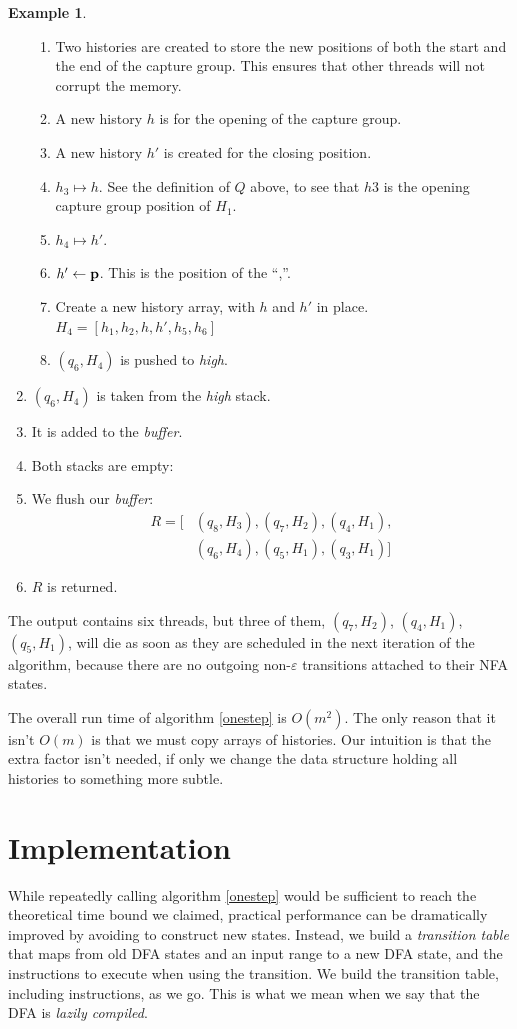 \documentclass[english]{sigplanconf}
\theoremstyle{definition}
\newtheorem{example}{Example}[section]
\begin{document}
\begin{example}
\begin{enumerate}
\begin{enumerate}
	\item Two histories are created to store the new positions of both the start and the end of the capture group. 
	This ensures that other threads will not corrupt the memory.
	\item A new history $h$ is for the opening of the capture group.
	\item A new history $h'$ is created for the closing position.
	\item $h_3 \mapsto h$. See the definition of $Q$ above, to see that $h3$ is the opening capture group position of $H_1$.
	\item $h_4 \mapsto h'$.
	\item $h'\leftarrow\mathbf{\mathbf{p}}$. This is the position of the ``,''.
	\item Create a new history array, with $h$ and $h'$ in place. 
		$H_4 = [h_1, h_2, h, h', h_5, h_6]$
	\item $(q_6, H_4)$ is pushed to \emph{high}.
\end{enumerate}
\item $(q_6, H_4)$ is taken from the \emph{high} stack.
\item It is added to the \emph{buffer}.
\item Both stacks are empty:
\item We flush our \emph{buffer}: 
\begin{align*}
R=[&(q_8, H_3), (q_7, H_2), (q_4, H_1),\\ &(q_6, H_4), (q_5, H_1), (q_3, H_1)]
\end{align*}
\item $R$ is returned.
\end{enumerate}
\end{example}

The output contains six threads, but three of them,  $(q_7, H_2)$,
$(q_4, H_1)$,  $(q_5, H_1)$, will die as soon as they are scheduled in
the next iteration of the algorithm, because there are no outgoing
non-$\varepsilon$ transitions attached to their NFA states.

The overall run time of algorithm \ref{onestep} is $O(m^2)$. The
only reason that it isn't $O(m)$ is that we must copy arrays of
histories. Our intuition is that the extra factor isn't needed, if
only we change the data structure holding all histories to something
more subtle.

\section{Implementation}
While repeatedly calling algorithm \ref{onestep} would be sufficient
to reach the theoretical time bound we claimed, practical performance
can be dramatically improved by avoiding to construct new states.
Instead, we build a \emph{transition table} that maps from old DFA
states and an input range to a new DFA state, and the instructions
to execute when using the transition. We build the transition table,
including instructions, as we go. This is what we mean when we say
that the DFA is \emph{lazily compiled}. 
\end{document}
